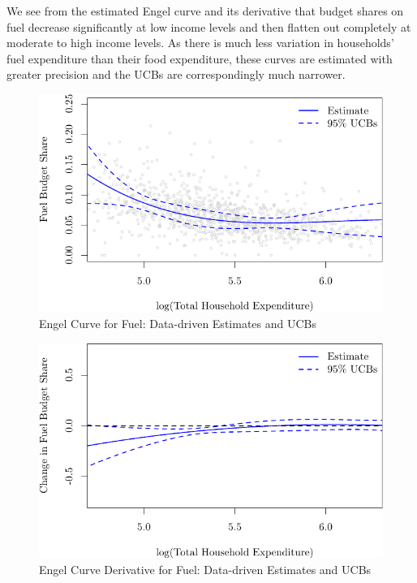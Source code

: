 \documentclass[
]{jss}
\begin{document}
We see from the estimated Engel curve and its derivative that budget
shares on fuel decrease significantly at low income levels and then
flatten out completely at moderate to high income levels. As there is
much less variation in households' fuel expenditure than their food
expenditure, these curves are estimated with greater precision and the
UCBs are correspondingly much narrower.

\begin{figure}
\centering
\includegraphics{npiv_files/figure-latex/fuel-dd-1.pdf}
\caption{Engel Curve for Fuel: Data-driven Estimates and UCBs}
\end{figure}

\begin{figure}
\centering
\includegraphics{npiv_files/figure-latex/fuel-dd-deriv-1.pdf}
\caption{Engel Curve Derivative for Fuel: Data-driven Estimates and
UCBs}
\end{figure}


\end{document}
